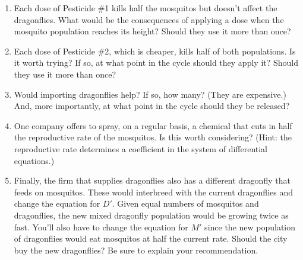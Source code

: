 \documentclass
[justified,nohyper]
{tufte-handout}
\begin{document}
\begin{enumerate}
  \item Each dose of Pesticide \#1 kills half the mosquitos but doesn't affect the dragonflies. What would be the consequences of applying a dose when the mosquito population reaches its height? Should they use it more than once?
  \item Each dose of Pesticide \#2, which is cheaper, kills half of both populations. Is it worth trying? If so, at what point in the cycle should they apply it? Should they use it more than once?
  \item Would importing dragonflies help? If so, how many? (They are expensive.) And, more importantly, at what point in the cycle should they be released?
  \item One company offers to spray, on a regular basis, a chemical that cuts in half the reproductive rate of the mosquitos. Is this worth considering? (Hint: the reproductive rate determines a coefficient in the system of differential equations.)
  \item Finally, the firm that supplies dragonflies also has a different dragonfly that feeds on mosquitos. These would interbreed with the current dragonflies and change the equation for $D'$. Given equal numbers of mosquitos and dragonflies, the new mixed dragonfly population would be growing twice as fast. You'll also have to change the equation for $M'$ since the new population of dragonflies would eat mosquitos at half the current rate. Should the city buy the new dragonflies? Be sure to explain your recommendation.
\end{enumerate}
\end{document}
